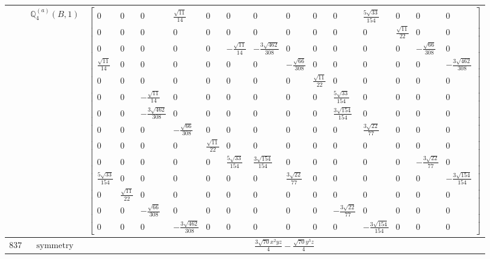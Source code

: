 \documentclass[fleqn,8pt,landscape]{jsarticle}
\begin{document}
\begin{longtable}{ccc}
$  $ & $ \mathbb{Q}_{4}^{(a)}(B,1) $ & $ \begin{bmatrix} 0 & 0 & 0 & \frac{\sqrt{11}}{14} & 0 & 0 & 0 & 0 & 0 & 0 & \frac{5 \sqrt{33}}{154} & 0 & 0 & 0 \\ 0 & 0 & 0 & 0 & 0 & 0 & 0 & 0 & 0 & 0 & 0 & \frac{\sqrt{11}}{22} & 0 & 0 \\ 0 & 0 & 0 & 0 & 0 & - \frac{\sqrt{11}}{14} & - \frac{3 \sqrt{462}}{308} & 0 & 0 & 0 & 0 & 0 & - \frac{\sqrt{66}}{308} & 0 \\ \frac{\sqrt{11}}{14} & 0 & 0 & 0 & 0 & 0 & 0 & - \frac{\sqrt{66}}{308} & 0 & 0 & 0 & 0 & 0 & - \frac{3 \sqrt{462}}{308} \\ 0 & 0 & 0 & 0 & 0 & 0 & 0 & 0 & \frac{\sqrt{11}}{22} & 0 & 0 & 0 & 0 & 0 \\ 0 & 0 & - \frac{\sqrt{11}}{14} & 0 & 0 & 0 & 0 & 0 & 0 & \frac{5 \sqrt{33}}{154} & 0 & 0 & 0 & 0 \\ 0 & 0 & - \frac{3 \sqrt{462}}{308} & 0 & 0 & 0 & 0 & 0 & 0 & \frac{3 \sqrt{154}}{154} & 0 & 0 & 0 & 0 \\ 0 & 0 & 0 & - \frac{\sqrt{66}}{308} & 0 & 0 & 0 & 0 & 0 & 0 & \frac{3 \sqrt{22}}{77} & 0 & 0 & 0 \\ 0 & 0 & 0 & 0 & \frac{\sqrt{11}}{22} & 0 & 0 & 0 & 0 & 0 & 0 & 0 & 0 & 0 \\ 0 & 0 & 0 & 0 & 0 & \frac{5 \sqrt{33}}{154} & \frac{3 \sqrt{154}}{154} & 0 & 0 & 0 & 0 & 0 & - \frac{3 \sqrt{22}}{77} & 0 \\ \frac{5 \sqrt{33}}{154} & 0 & 0 & 0 & 0 & 0 & 0 & \frac{3 \sqrt{22}}{77} & 0 & 0 & 0 & 0 & 0 & - \frac{3 \sqrt{154}}{154} \\ 0 & \frac{\sqrt{11}}{22} & 0 & 0 & 0 & 0 & 0 & 0 & 0 & 0 & 0 & 0 & 0 & 0 \\ 0 & 0 & - \frac{\sqrt{66}}{308} & 0 & 0 & 0 & 0 & 0 & 0 & - \frac{3 \sqrt{22}}{77} & 0 & 0 & 0 & 0 \\ 0 & 0 & 0 & - \frac{3 \sqrt{462}}{308} & 0 & 0 & 0 & 0 & 0 & 0 & - \frac{3 \sqrt{154}}{154} & 0 & 0 & 0 \end{bmatrix} $ \\ \hline
$ 837 $ & $ \text{symmetry} $ & $ \frac{3 \sqrt{70} x^{2} y z}{4} - \frac{\sqrt{70} y^{3} z}{4} $ \\

\end{longtable}
\end{document}
